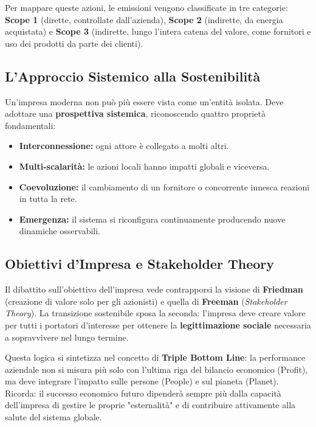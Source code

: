 \documentclass[a4paper,10pt]{article}
\begin{document}
Per mappare queste azioni, le emissioni vengono classificate in tre categorie: \textbf{Scope 1} (dirette, controllate dall'azienda), \textbf{Scope 2} (indirette, da energia acquistata) e \textbf{Scope 3} (indirette, lungo l'intera catena del valore, come fornitori e uso dei prodotti da parte dei clienti).

\subsection*{L'Approccio Sistemico alla Sostenibilità}

Un'impresa moderna non può più essere vista come un'entità isolata. Deve adottare una \textbf{prospettiva sistemica}, riconoscendo quattro proprietà fondamentali:
\begin{itemize}
    \item \textbf{Interconnessione:} ogni attore è collegato a molti altri.
    \item \textbf{Multi-scalarità:} le azioni locali hanno impatti globali e viceversa.
    \item \textbf{Coevoluzione:} il cambiamento di un fornitore o concorrente innesca reazioni in tutta la rete.
    \item \textbf{Emergenza:} il sistema si riconfigura continuamente producendo nuove dinamiche osservabili.
\end{itemize}

\subsection*{Obiettivi d'Impresa e Stakeholder Theory}

Il dibattito sull'obiettivo dell'impresa vede contrapporsi la visione di \textbf{Friedman} (creazione di valore solo per gli azionisti) e quella di \textbf{Freeman} (\textit{Stakeholder Theory}). La transizione sostenibile sposa la seconda: l'impresa deve creare valore per tutti i portatori d'interesse per ottenere la \textbf{legittimazione sociale} necessaria a sopravvivere nel lungo termine. 

Questa logica si sintetizza nel concetto di \textbf{Triple Bottom Line}: la performance aziendale non si misura più solo con l'ultima riga del bilancio economico (Profit), ma deve integrare l'impatto sulle persone (People) e sul pianeta (Planet). Ricorda: il successo economico futuro dipenderà sempre più dalla capacità dell'impresa di gestire le proprie "esternalità" e di contribuire attivamente alla salute del sistema globale.
\end{document}
